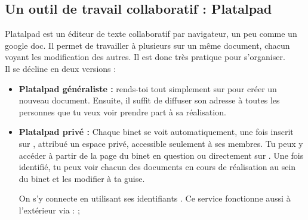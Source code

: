 \subsection{Un outil de travail collaboratif : Platalpad}
\label{platalpad}

Platalpad est un \'editeur de texte collaboratif par navigateur, un peu comme un google doc. Il permet de travailler \`a plusieurs sur un m\^eme document, chacun voyant les modification des autres. Il est donc tr\`es pratique pour s'organiser.\\
Il se d\'ecline en deux versions :
\begin{itemize}

\item \textbf{Platalpad g\'en\'eraliste :} rends-toi tout simplement sur  pour cr\'eer un nouveau document. Ensuite, il suffit de diffuser son adresse \`a toutes les personnes que tu veux voir prendre part \`a sa r\'ealisation. \\

\item \textbf{Platalpad priv\'e :} Chaque binet se voit automatiquement, une fois inscrit sur \fkz, attribu\'e un espace priv\'e, accessible seulement \`a ses membres. Tu peux y acc\'eder \`a partir de la page \fkz du binet en question ou directement sur . Une fois identifi\'e, tu peux voir chacun des documents en cours de r\'ealisation au sein du binet et les modifier \`a ta guise.

On s'y connecte en utilisant ses identifiants \fkz. Ce service fonctionne aussi \`a l'ext\'erieur via : 
 ;

\end{itemize}

